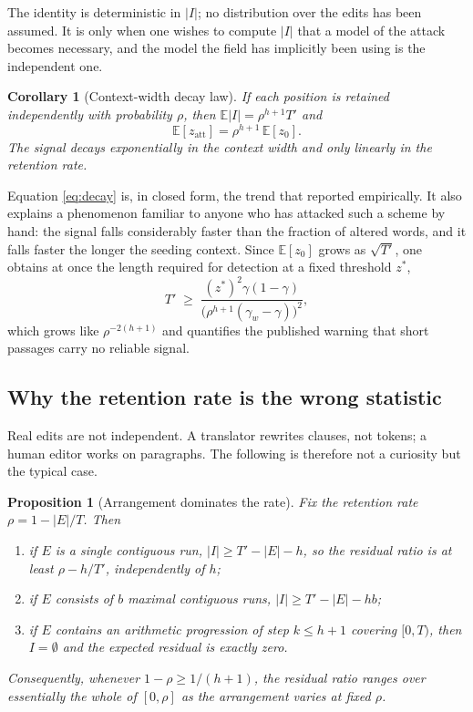 \documentclass{article}
\theoremstyle{plain}
\newtheorem{proposition}[theorem]{Proposition}
\newtheorem{corollary}[theorem]{Corollary}
\theoremstyle{definition}
\numberwithin{equation}{section}
\begin{document}
The identity is deterministic in $|I|$; no distribution over the edits
has been assumed. It is only when one wishes to compute $|I|$ that a
model of the attack becomes necessary, and the model the field has
implicitly been using is the independent one.

\begin{corollary}[Context-width decay law]\label{cor:decay}
If each position is retained independently with probability $\rho$, then
$\mathbb{E}|I| = \rho^{h+1}T'$ and
\begin{equation}\label{eq:decay}
\mathbb{E}[z_{\mathrm{att}}] = \rho^{h+1}\,\mathbb{E}[z_0].
\end{equation}
The signal decays exponentially in the context width and only linearly
in the retention rate.
\end{corollary}

Equation \eqref{eq:decay} is, in closed form, the trend that
\cite{KGW24} reported empirically. It also explains a phenomenon
familiar to anyone who has attacked such a scheme by hand: the signal
falls considerably faster than the fraction of altered words, and it
falls faster the longer the seeding context. Since
$\mathbb{E}[z_0]$ grows as $\sqrt{T'}$, one obtains at once the length
required for detection at a fixed threshold $z^{*}$,
\begin{equation}\label{eq:length}
T' \;\ge\; \frac{(z^{*})^{2}\gamma(1-\gamma)}
{\bigl(\rho^{h+1}(\gamma_w-\gamma)\bigr)^{2}},
\end{equation}
which grows like $\rho^{-2(h+1)}$ and quantifies the published warning
that short passages carry no reliable signal.

\subsection{Why the retention rate is the wrong statistic}

Real edits are not independent. A translator rewrites clauses, not
tokens; a human editor works on paragraphs. The following is therefore
not a curiosity but the typical case.

\begin{proposition}[Arrangement dominates the rate]\label{prop:arrangement}
Fix the retention rate $\rho = 1 - |E|/T$. Then
\begin{enumerate}
\item[(i)] if $E$ is a single contiguous run,
$|I| \ge T' - |E| - h$, so the residual ratio is at least
$\rho - h/T'$, \emph{independently of $h$};
\item[(ii)] if $E$ consists of $b$ maximal contiguous runs,
$|I| \ge T' - |E| - hb$;
\item[(iii)] if $E$ contains an arithmetic progression of step
$k \le h+1$ covering $[0,T)$, then $I = \emptyset$ and the expected
residual is exactly zero.
\end{enumerate}
Consequently, whenever $1-\rho \ge 1/(h+1)$, the residual ratio ranges
over essentially the whole of $[0,\rho]$ as the arrangement varies at
fixed $\rho$.
\end{proposition}
\end{document}
